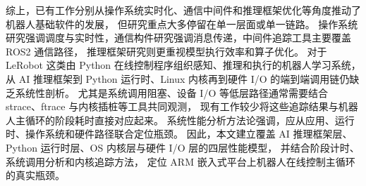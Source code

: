综上，已有工作分别从操作系统实时化、通信中间件和推理框架优化等角度推动了机器人基础软件的发展，
但研究重点大多停留在单一层面或单一链路。
操作系统研究强调调度与实时性，通信构件研究强调消息传递，中间件追踪工具主要覆盖 ROS2 通信路径，
推理框架研究则更重视模型执行效率和算子优化。
对于 LeRobot 这类由 Python 在线控制程序组织感知、推理和执行的机器人学习系统，
从 AI 推理框架到 Python 运行时、Linux 内核再到硬件 I/O 的端到端调用链仍缺乏系统性剖析。
尤其是系统调用阻塞、设备 I/O 等低层路径通常需要结合 strace、ftrace 与内核插桩等工具共同观测，
现有工作较少将这些追踪结果与机器人主循环的阶段耗时直接对应起来。
系统性能分析方法论强调，应从应用、运行时、操作系统和硬件路径联合定位瓶颈\cite{perfbook}。
因此，本文建立覆盖 AI 推理框架层、Python 运行时层、OS 内核层与硬件 I/O 层的四层性能模型，
并结合阶段计时、系统调用分析和内核追踪方法，
定位 ARM 嵌入式平台上机器人在线控制主循环的真实瓶颈。
